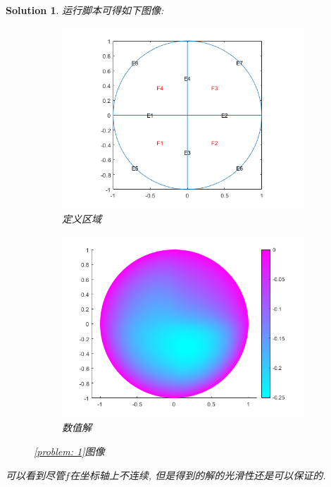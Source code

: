 \documentclass[a4paper, 12pt]{ctexart}
\theoremstyle{plain}
\theoremstyle{plain}
\theoremstyle{plain}
\theoremstyle{nonumberplain}
\newtheorem{solution}{Solution}
\begin{document}
\begin{solution}
        运行脚本可得如下图像:
        \begin{figure}[H]
            \centering
            \begin{subfigure}[b]{0.45\textwidth}
                \centering
                \includegraphics[width=\textwidth]{wc11.png}
                \caption{定义区域}
            \end{subfigure}
            \hfill
            \begin{subfigure}[b]{0.45\textwidth}
                \centering
                \includegraphics[width=\textwidth]{wc12.png}
                \caption{数值解}
            \end{subfigure}
            \caption{\ref{problem: 1}图像}
       \end{figure}

       可以看到尽管$f$在坐标轴上不连续, 但是得到的解的光滑性还是可以保证的.
    \end{solution}
\end{document}
